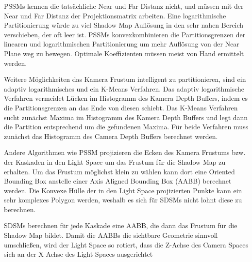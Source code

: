 \documentclass[runningheaders,a4paper]{llncs}
\begin{document}
PSSMs kennen die tatsächliche Near und Far Distanz nicht, und müssen mit der Near und Far Distanz der Projektionsmatrix arbeiten.
Eine logarithmische Partitionierung würde zu viel Shadow Map Auflösung in den sehr nahen Bereich verschieben, der oft leer ist.
PSSMs konvexkombinieren die Partitionsgrenzen der linearen und logarithmischen Partitionierung um mehr Auflösung von der Near Plane weg zu bewegen.
Optimale Koeffizienten müssen meist von Hand ermittelt werden.

Weitere Möglichkeiten das Kamera Frustum intelligent zu partitionieren, sind ein adaptiv logarithmisches und ein K-Means Verfahren.
Das adaptiv logarithmische Verfahren vermeidet Lücken im Histogramm des Kamera Depth Buffers, indem es die Partitionsgrenzen an das Ende von diesen schiebt.
Das K-Means Verfahren sucht zunächst Maxima im Histogramm des Kamera Depth Buffers und legt dann die Partition entsprechend um die gefundenen Maxima.
Für beide Verfahren muss zunächst das Histogramm des Camera Depth Buffers berechnet werden.


Andere Algorithmen wie PSSM \cite{pssm} projizieren die Ecken des Kamera Frustums bzw. der Kaskaden in den Light Space um das Frustum für die Shadow Map zu erhalten.
Um das Frustum möglichst klein zu wählen kann dort eine Oriented Bounding Box anstelle einer Axis Aligned Bounding Box (AABB) berechnet werden.
Die Konvexe Hülle der in den Light Space projizierten Punkte kann ein sehr komplexes Polygon werden, weshalb es sich für SDSMs nicht lohnt diese zu berechnen.

SDSMs berechnen für jede Kaskade eine AABB, die dann das Frustum für die Shadow Map bildet.
Damit die AABBs die sichtbare Geometrie sinnvoll umschließen, wird der Light Space so rotiert, dass die Z-Achse des Camera Spaces sich an der X-Achse des Light Spaces ausgerichtet
\end{document}
